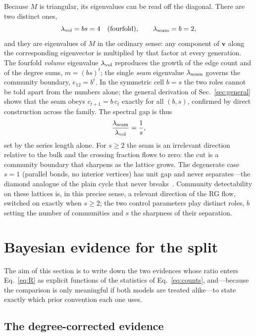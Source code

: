 \documentclass[preprint,12pt]{elsarticle}
\begin{document}
Because $M$ is triangular, its eigenvalues can be read off the diagonal. There
are two distinct ones,
\begin{equation}
  \lambda_{\rm vol}=bs=4 \quad\text{(fourfold)},
  \qquad
  \lambda_{\rm seam}=b=2 ,
  \label{eq:eigs}
\end{equation}
and they are eigenvalues of $M$ in the ordinary sense: any component of $\bm v$
along the corresponding eigenvector is multiplied by that factor at every
generation. The fourfold \emph{volume} eigenvalue $\lambda_{\rm vol}$
reproduces the growth of the edge count and of the degree sums, $m=(bs)^t$; the
single \emph{seam} eigenvalue $\lambda_{\rm seam}$ governs the community
boundary, $e_{12}=b^t$. In the symmetric cell $b=s$ the two roles cannot be
told apart from the numbers alone; the general derivation of
Sec.~\ref{sec:general} shows that the seam obeys $c_{t+1}=b\,c_t$ exactly for
all $(b,s)$, confirmed by direct construction across the family. The spectral
gap is thus
\begin{equation}
  \frac{\lambda_{\rm seam}}{\lambda_{\rm vol}} = \frac{1}{s} ,
  \label{eq:gap}
\end{equation}
set by the series length alone. For $s\ge2$ the seam is an irrelevant direction
relative to the bulk and the crossing fraction flows to zero: the cut is a
community boundary that sharpens as the lattice grows. The degenerate case $s=1$
(parallel bonds, no interior vertices) has unit gap and never separates---the
diamond analogue of the plain cycle that never
breaks~\cite{vazquez2026ringwantsbroken}. Community detectability on these
lattices is, in this precise sense, a relevant direction of the RG flow,
switched on exactly when $s\ge2$; the two control parameters play distinct
roles, $b$ setting the number of communities and $s$ the sharpness of their
separation.

\section{Bayesian evidence for the split}
\label{sec:evidence}

The aim of this section is to write down the two evidences whose ratio enters
Eq.~\eqref{eq:R} as explicit functions of the statistics of
Eq.~\eqref{eq:counts}, and---because the comparison is only meaningful if both
models are treated alike---to state exactly which prior convention each one
uses.

\subsection{The degree-corrected evidence}
\end{document}
